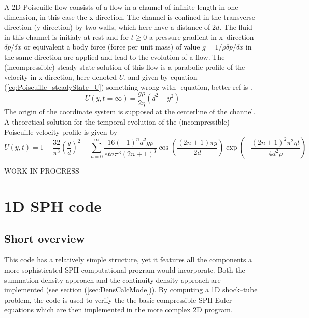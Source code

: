 \documentclass{report}
\begin{document}
A 2D Poiseuille flow consists of a flow in a channel of infinite length in one dimension, in this case the x direction. The channel is confined  in the transverse direction (y-direction) by two walls, which here have a distance of $2d$. The fluid in this channel is initialy at rest and for $t\geq0$ a pressure gradient in x--direction $\delta p/\delta x $ or equivalent a body force (force per unit mass) of value $g=1/\rho \delta p/\delta x$ \cite{Sigalotti2003} in the same direction are applied and lead to the evolution of a flow. The (incompressible) steady state solution of this flow is a parabolic profile of the velocity in x direction, here denoted $U$, and given by equation (\ref{eq:Poiseuille_steadyState_U}) something wrong with \cite{Basa2009}-equation, better ref is \cite{Sigalotti2003}.
\begin{equation}
\label{eq:Poiseuille_steadyState_U}
 U(y,t=\infty)=\frac{g \rho}{2 \eta}(d^2-y^2)
\end{equation}
The origin of the coordinate system is supposed at the centerline of the channel.
A theoretical solution for the temporal evolution of the (incompressible) Poiseuille velocity profile is given by \cite{Sigalotti2003}
\begin{equation}
\label{eq:Poiseuille_Series}
 U(y,t)=1-\frac{32}{\pi^3}\left(\frac{y}{d}\right)^2 -\sum_{n=0}^\infty \frac{16(-1)^n d^2 g \rho}{eta \pi^3 (2 n +1)^3}\cos \left(\frac{(2n+1)\pi y}{2 d} \right)\exp \left(- \frac{(2n+1)^2\pi^2\eta t}{4d^2\rho} \right)
\end{equation}
 

WORK IN PROGRESS

\section{1D SPH code}
\label{sec:1DSPHcode}

\subsection{Short overview}

This code has a relatively simple structure, yet it features all the components
a more sophisticated SPH computational program would incorporate. Both the summation 
density approach and the continuity density approach are implemented (see section (\ref{sec:DensCalcMode})). By computing a 1D shock--tube problem, the code is used to verify the the basic compressible SPH Euler equations which are then implemented in the more complex 2D program.
 
\end{document}
